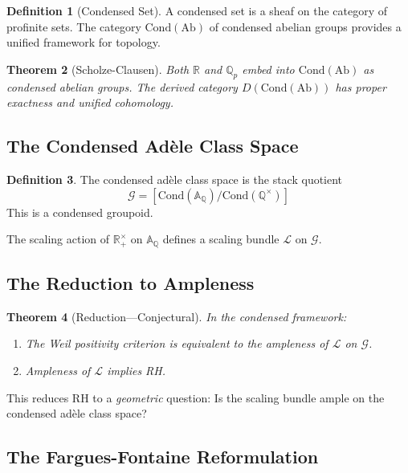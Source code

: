 \documentclass[12pt, a4paper]{article}
\newtheorem{theorem}{Theorem}[section]
\theoremstyle{definition}
\newtheorem{definition}[theorem]{Definition}
\newcommand{\Q}{\mathbb{Q}}
\newcommand{\R}{\mathbb{R}}
\newcommand{\A}{\mathbb{A}}
\newcommand{\Cond}{\mathrm{Cond}}
\begin{document}
\begin{definition}[Condensed Set]
A condensed set is a sheaf on the category of profinite sets. The category $\Cond(\mathrm{Ab})$ of condensed abelian groups provides a unified framework for topology.
\end{definition}

\begin{theorem}[Scholze-Clausen]
Both $\R$ and $\Q_p$ embed into $\Cond(\mathrm{Ab})$ as condensed abelian groups. The derived category $D(\Cond(\mathrm{Ab}))$ has proper exactness and unified cohomology.
\end{theorem}

\subsection{The Condensed Ad\`ele Class Space}

\begin{definition}
The condensed ad\`ele class space is the stack quotient
\begin{equation}
\mathcal{G} = [\Cond(\A_\Q) / \Cond(\Q^\times)]
\end{equation}
This is a condensed groupoid.
\end{definition}

The scaling action of $\R_+^\times$ on $\A_\Q$ defines a scaling bundle $\mathcal{L}$ on $\mathcal{G}$.

\subsection{The Reduction to Ampleness}

\begin{theorem}[Reduction---Conjectural]
In the condensed framework:
\begin{enumerate}
\item The Weil positivity criterion is equivalent to the ampleness of $\mathcal{L}$ on $\mathcal{G}$.
\item Ampleness of $\mathcal{L}$ implies RH.
\end{enumerate}
\end{theorem}

This reduces RH to a \textit{geometric} question: Is the scaling bundle ample on the condensed ad\`ele class space?

\subsection{The Fargues-Fontaine Reformulation}
\end{document}
